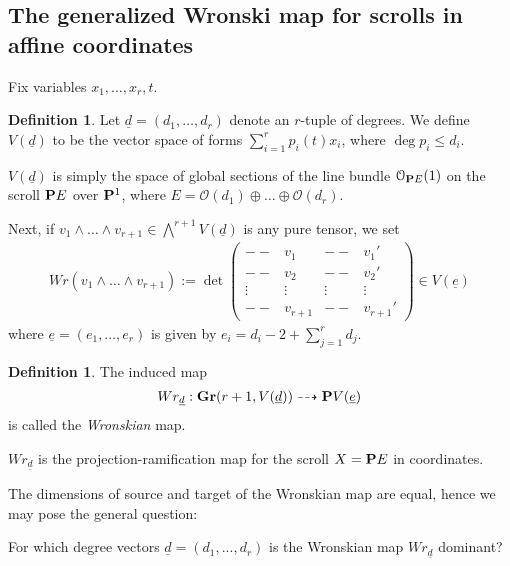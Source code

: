 \documentclass[11pt,reqno]{amsart}
\theoremstyle{plain}
\theoremstyle{definition}
\newtheorem{definition}[theorem]{Definition}
\theoremstyle{remark}
\numberwithin{equation}{section}
\numberwithin{equation}{section}
\renewcommand{\O}{\mathcal O}
\begin{document}
\subsection{The generalized Wronski map for scrolls in affine coordinates} %
 \label{sub:the_generalized_wronski_map}
 
 Fix variables $x_{1}, \dots, x_{r}, t$.
\begin{definition}
  \label{definition:V}
  Let $\underline{d} = (d_{1}, \dots, d_{r})$ denote an $r$-tuple of degrees. We define $V(\underline{d})$ to be the vector space of forms $\sum_{i=1}^{r}p_{i}(t)x_{i}$, where $\deg p_{i} \leq d_{i}$.
\end{definition}

\begin{remark}
  $V(\underline{d})$ is simply the space of global sections of the line bundle $\O_{\P E}(1)$ on the scroll $\P E$ over $\P^{1}$, where $E = \O(d_{1}) \oplus \dots \oplus \O(d_{r})$.
\end{remark}

Next, if $v_{1} \wedge \dots \wedge v_{r+1} \in \bigwedge^{r+1}V(\underline{d})$ is any pure tensor, we set 
\begin{align}
  Wr(v_{1} \wedge \dots \wedge v_{r+1}) := \det \begin{pmatrix}
    -- & v_{1} & -- & v_{1}'\\
    -- & v_{2} & -- & v_{2}'\\
    \vdots& \vdots & \vdots & \vdots\\
    -- & v_{r+1} & -- & v_{r+1}'
  \end{pmatrix} \in V(\underline{e})
\end{align}
where $\underline{e}= (e_{1}, \dots, e_{r})$ is given by $e_{i} = d_{i}-2 + \sum_{j=1}^{r}d_{j}$.

\begin{definition}
  \label{definition:Wronskian}
  The induced map 
  \begin{align}
    Wr_{\underline{d}}: \Gr(r+1, V(\underline{d})) \dashrightarrow \P V(\underline{e})
  \end{align}
  is called the {\sl Wronskian} map.
\end{definition}

\begin{remark}
  $Wr_{\underline{d}}$ is the projection-ramification map for the scroll $X = \P E$ in coordinates.
\end{remark}

The dimensions of source and target of the Wronskian map are equal, hence we may pose the general question: 
\begin{problem}
\label{problem:DominantWronskian}
  For which degree vectors $\underline{d} = (d_{1}, ..., d_{r})$ is the Wronskian map $Wr_{\underline{d}}$ dominant?
\end{problem}
\end{document}

